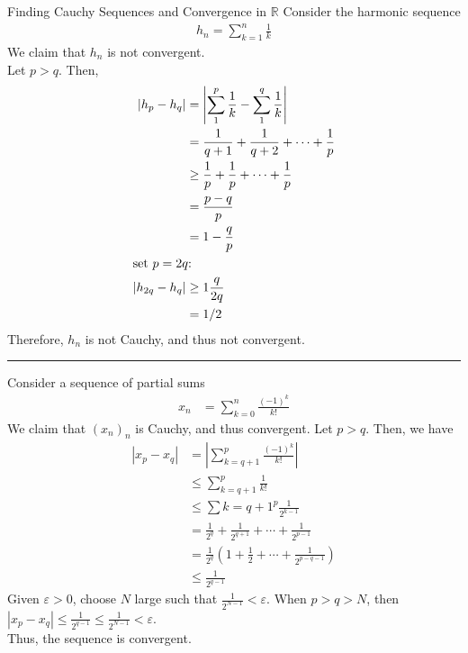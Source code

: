 \documentclass[8pt]{extarticle}
\newcommand{\R}{\mathbb{R}}
\begin{document}
  \begin{problem}{Finding Cauchy Sequences and Convergence in $\R$}
    Consider the harmonic sequence
    \begin{align*}
      h_n = \sum_{k=1}^{n}\frac{1}{k}
    \end{align*}
    We claim that $h_n$ is not convergent.\\

    Let $p > q$. Then,
    \begin{align*}
      \left|h_p-h_q\right| &= \left|\sum_{1}^{p}\frac{1}{k} - \sum_{1}^{q}\frac{1}{k}\right|\\
                           &= \frac{1}{q+1} + \frac{1}{q+2} + \cdots + \frac{1}{p}\\
                           &\geq \frac{1}{p} + \frac{1}{p} + \cdots + \frac{1}{p}\\
                           &= \frac{p-q}{p} \\
                           &= 1-\frac{q}{p}\\
                           \shortintertext{set $p = 2q$:}
      \left|h_{2q}-h_q\right| &\geq 1\frac{q}{2q}\\
                              &= 1/2
    \end{align*}
    Therefore, $h_n$ is not Cauchy, and thus not convergent.\\
    \vspace{4pt}
    \rule{\textwidth}{0.4pt}
    \vspace{4pt}
    Consider a sequence of partial sums
    \begin{align*}
      x_n &= \sum_{k=0}^{n} \frac{(-1)^k}{k!}
    \end{align*}
    We claim that $(x_n)_n$ is Cauchy, and thus convergent. Let $p > q$. Then, we have
    \begin{align*}
      \left|x_p-x_q\right| &= \left|\sum_{k=q+1}^{p}\frac{(-1)^k}{k!}\right|\\
                           &\leq \sum_{k=q+1}^{p}\frac{1}{k!}\\
                           &\leq \sum{k=q+1}^{p}\frac{1}{2^{k-1}}\\
                           &= \frac{1}{2^q} + \frac{1}{2^{q+1}} + \cdots + \frac{1}{2^{p-1}}\\
                           &= \frac{1}{2^q}\left(1 + \frac{1}{2} + \cdots + \frac{1}{2^{p-q-1}}\right)\\
                           &\leq \frac{1}{2^{q-1}}
    \end{align*}
    Given $\varepsilon > 0$, choose $N$ large such that $\displaystyle \frac{1}{2^{N-1}} < \varepsilon$. When $p > q > N$, then $\displaystyle|x_p-x_q| \leq \frac{1}{2^{q-1}} \leq \frac{1}{2^{N-1}} < \varepsilon$.\\

    Thus, the sequence is convergent.
  \end{problem}
\end{document}
